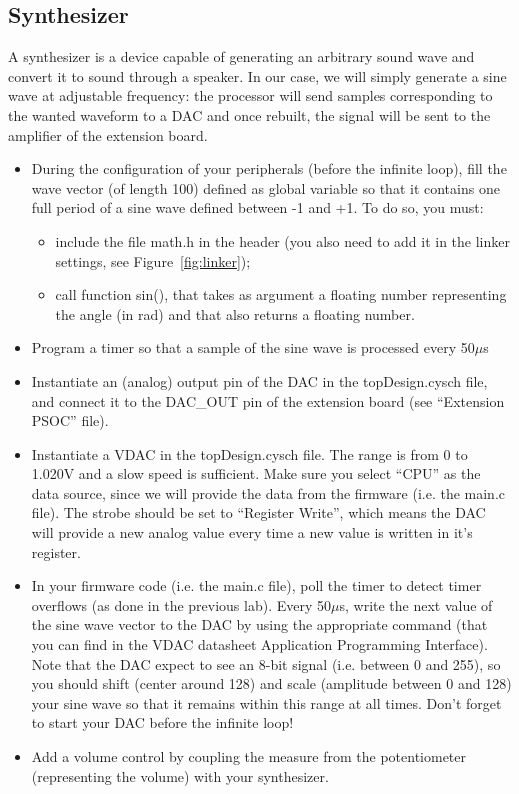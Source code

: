 \documentclass[11pt,a4paper]{article}
\theoremstyle{definition}%
\begin{document}
\subsection{Synthesizer}
A synthesizer is a device capable of generating an arbitrary sound wave and convert it to sound through a speaker.
In our case, we will simply generate a sine wave at adjustable frequency: the processor will send samples corresponding to the wanted waveform to a DAC and once rebuilt, the signal will be sent to the amplifier of the extension board.
\begin{itemize}
	\item During the configuration of your peripherals (before the infinite loop), fill the wave vector (of length 100) defined as global variable so that it contains one full period of a sine wave defined between -1 and +1.
    To do so, you must:
	\begin{itemize}
		\item include the file math.h in the header (you also need to add it in the linker settings, see Figure~\ref{fig:linker});
		\item call function sin(), that takes as argument a floating number representing the angle (in rad) and that also returns a floating number.
	\end{itemize}
	\item Program a timer so that a sample of the sine wave is processed every 50$\mu$s
	\item Instantiate an (analog) output pin of the DAC in the topDesign.cysch file, and connect it to the DAC\_OUT pin of the extension board (see ``Extension PSOC'' file). 
	\item Instantiate a VDAC in the topDesign.cysch file. The range is from 0 to 1.020V and a slow speed is sufficient. Make sure you select ``CPU'' as the data source, since we will provide the data from the firmware (i.e. the main.c file). The strobe should be set to ``Register Write'', which means the DAC will provide a new analog value every time a new value is written in it's register. 
	\item In your firmware code (i.e. the main.c file), poll the timer to detect timer overflows (as done in the previous lab). Every 50$\mu$s, write the next value of the sine wave vector to the DAC by using the appropriate command (that you can find in the VDAC datasheet Application Programming Interface). Note that the DAC expect to see an 8-bit signal (i.e. between 0 and 255), so you should shift (center around 128) and scale (amplitude between 0 and 128) your sine wave so that it remains within this range at all times. Don't forget to start your DAC before the infinite loop! 
	\item Add a volume control by coupling the measure from the potentiometer (representing the volume) with your synthesizer.
\end{itemize}
\end{document}
